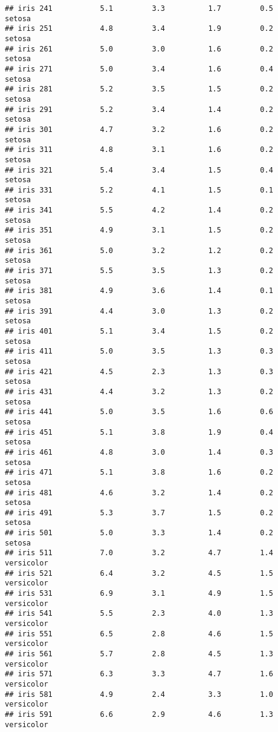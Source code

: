 \documentclass[
]{article}
\begin{document}
\begin{verbatim}
## iris 241           5.1         3.3          1.7         0.5     setosa
## iris 251           4.8         3.4          1.9         0.2     setosa
## iris 261           5.0         3.0          1.6         0.2     setosa
## iris 271           5.0         3.4          1.6         0.4     setosa
## iris 281           5.2         3.5          1.5         0.2     setosa
## iris 291           5.2         3.4          1.4         0.2     setosa
## iris 301           4.7         3.2          1.6         0.2     setosa
## iris 311           4.8         3.1          1.6         0.2     setosa
## iris 321           5.4         3.4          1.5         0.4     setosa
## iris 331           5.2         4.1          1.5         0.1     setosa
## iris 341           5.5         4.2          1.4         0.2     setosa
## iris 351           4.9         3.1          1.5         0.2     setosa
## iris 361           5.0         3.2          1.2         0.2     setosa
## iris 371           5.5         3.5          1.3         0.2     setosa
## iris 381           4.9         3.6          1.4         0.1     setosa
## iris 391           4.4         3.0          1.3         0.2     setosa
## iris 401           5.1         3.4          1.5         0.2     setosa
## iris 411           5.0         3.5          1.3         0.3     setosa
## iris 421           4.5         2.3          1.3         0.3     setosa
## iris 431           4.4         3.2          1.3         0.2     setosa
## iris 441           5.0         3.5          1.6         0.6     setosa
## iris 451           5.1         3.8          1.9         0.4     setosa
## iris 461           4.8         3.0          1.4         0.3     setosa
## iris 471           5.1         3.8          1.6         0.2     setosa
## iris 481           4.6         3.2          1.4         0.2     setosa
## iris 491           5.3         3.7          1.5         0.2     setosa
## iris 501           5.0         3.3          1.4         0.2     setosa
## iris 511           7.0         3.2          4.7         1.4 versicolor
## iris 521           6.4         3.2          4.5         1.5 versicolor
## iris 531           6.9         3.1          4.9         1.5 versicolor
## iris 541           5.5         2.3          4.0         1.3 versicolor
## iris 551           6.5         2.8          4.6         1.5 versicolor
## iris 561           5.7         2.8          4.5         1.3 versicolor
## iris 571           6.3         3.3          4.7         1.6 versicolor
## iris 581           4.9         2.4          3.3         1.0 versicolor
## iris 591           6.6         2.9          4.6         1.3 versicolor

\end{verbatim}
\end{document}
